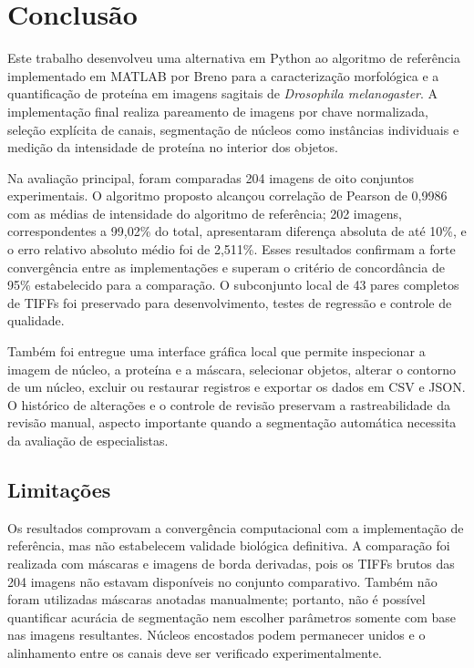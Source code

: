 \chapter{Conclusão}
\label{cap:conclusao}

Este trabalho desenvolveu uma alternativa em Python ao algoritmo de referência implementado em MATLAB por Breno para a caracterização morfológica e a quantificação de proteína em imagens sagitais de \textit{Drosophila melanogaster}. A implementação final realiza pareamento de imagens por chave normalizada, seleção explícita de canais, segmentação de núcleos como instâncias individuais e medição da intensidade de proteína no interior dos objetos.

Na avaliação principal, foram comparadas 204 imagens de oito conjuntos experimentais. O algoritmo proposto alcançou correlação de Pearson de 0,9986 com as médias de intensidade do algoritmo de referência; 202 imagens, correspondentes a 99,02\% do total, apresentaram diferença absoluta de até 10\%, e o erro relativo absoluto médio foi de 2,511\%. Esses resultados confirmam a forte convergência entre as implementações e superam o critério de concordância de 95\% estabelecido para a comparação. O subconjunto local de 43 pares completos de TIFFs foi preservado para desenvolvimento, testes de regressão e controle de qualidade.

Também foi entregue uma interface gráfica local que permite inspecionar a imagem de núcleo, a proteína e a máscara, selecionar objetos, alterar o contorno de um núcleo, excluir ou restaurar registros e exportar os dados em CSV e JSON. O histórico de alterações e o controle de revisão preservam a rastreabilidade da revisão manual, aspecto importante quando a segmentação automática necessita da avaliação de especialistas.

\section{Limitações}

Os resultados comprovam a convergência computacional com a implementação de referência, mas não estabelecem validade biológica definitiva. A comparação foi realizada com máscaras e imagens de borda derivadas, pois os TIFFs brutos das 204 imagens não estavam disponíveis no conjunto comparativo. Também não foram utilizadas máscaras anotadas manualmente; portanto, não é possível quantificar acurácia de segmentação nem escolher parâmetros somente com base nas imagens resultantes. Núcleos encostados podem permanecer unidos e o alinhamento entre os canais deve ser verificado experimentalmente.

